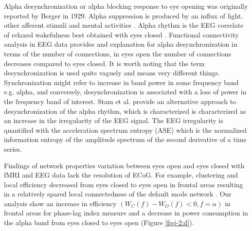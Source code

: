 \documentclass[11pt, onecolumn]{article}
\begin{document}
Alpha desynchronization or alpha blocking response to eye opening was originally reported by Berger in 1929. Alpha suppression is produced by an influx of light, other afferent stimuli and mental activities \citep{schomer2012niedermeyer}. Alpha rhythm is the EEG correlate of relaxed wakefulness best obtained with eyes closed \citep{niedermeyer2005electroencephalography}. Functional connectivity analysis in EEG data provides and explanation for alpha desynchronization in terms of the number of connections, in eyes open the number of connections decreases compared to eyes closed. It is worth noting that the term desynchronization is used quite vaguely and means very different things. Synchronization might refer to increase in band power in some frequency band e.g. alpha, and conversely, desynchronization is associated with a loss of power in the frequency band of interest. Stam et al.\citep{stam1993quantification} provide an alternative approach to desynchronization of the alpha rhythm, which is characterized is characterized as an increase in the irregularity of the EEG signal. The EEG irregularity is quantified with the acceleration spectrum entropy (ASE) which is the normalized information entropy of the amplitude spectrum of the second derivative of a time series. 

Findings of network properties variation between eyes open and eyes closed with fMRI and EEG data lack the resolution of ECoG. For example, clustering and local efficiency decreased from eyes closed to eyes open in frontal areas resulting in a relatively spared local connectedness of the default mode network \citep{scheeringa2008frontal}. Our analysis show an increase in efficiency $(W_C(f) - W_O(f) < 0, f = \alpha)$ in frontal areas for phase-lag index measure and a decrease in power consumption in the alpha band from eyes closed to eyes open (Figure \ref{figi-2:d}).
\end{document}
